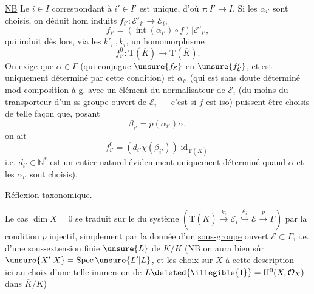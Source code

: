 \uline{NB} Le $i\in I$ correspondant à $i'\in I'$ est unique, d'où $\tau:I'\longrightarrow I$.
Si les $\alpha_{i'}$ sont choisis, on déduit  hom induits
$f_{i'}:\mathcal E'_{i'}\longrightarrow\mathcal E_i$,
\[
f_{i'}=(\operatorname{int}(\alpha_{i'})\circ f)|\mathcal E'_{i'},
\]
qui induit dès lors, via les $k'_{i'},k_i$, un homomorphisme
\[
f^0_{i'}:\mathrm T(\overline K)\longrightarrow\mathrm T(\overline K).
\]
On exige que $\alpha\in\Gamma$ (qui conjugue $\unsure{f_{\mathcal E}}$ en $\unsure{f'_{\mathcal E}}$, et est  uniquement déterminé par cette condition) et $\alpha_{i'}$ (qui est sans doute déterminé mod  composition à g. avec un élément du normalisateur de $\mathcal E_i$ (du moins du transporteur  d'un ss-groupe ouvert de $\mathcal E_i$ --- c'est  si $f$ est iso) puissent être choisis de telle façon que, posant
\[
\beta_{i'}=p(\alpha_{i'})\alpha,
\]
on ait
\[
f^0_{i'}=(d_{i'}\chi(\beta_{i'}))\operatorname{id}_{\mathrm T(\overline K)}
\]
i.e. $d_{i'}\in\mathbb N^*$ est un entier naturel évidemment uniquement déterminé \unsure{\}} quand $\alpha$ et les $\alpha_{i'}$ sont choisis).


 \uline{Réflexion taxonomique.}

Le cas $\dim X=0$ se traduit sur le  du système
$(\mathrm T(\overline K)\xrightarrow{k_i}\mathcal E_i\overset{\rho_i}{\hookrightarrow}\mathcal E\xrightarrow{p}\Gamma)$
 par la condition  $p$ injectif,  
simplement par la donnée d'un \uline{sous-groupe} ouvert $\mathcal E\subset\Gamma$, i.e. d'une sous-extension finie $\unsure{L}$ de $\overline K/K$
(NB on aura bien sûr $\unsure{X'|X}=\operatorname{Spec}\unsure{L'|L}$, et les choix  sur $X$   à cette description ---  ici au choix d'une telle immersion de $L\deleted{\illegible{1}}=\mathrm H^0(X,\mathcal O_X)$ dans $\overline K/K$)

